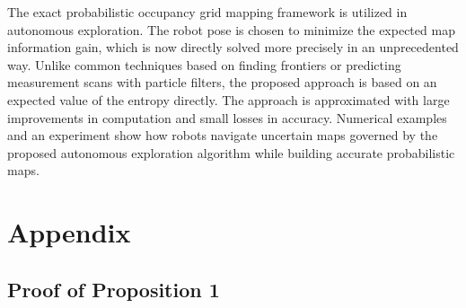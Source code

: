 \documentclass[smallextended]{svjour3}       %
\begin{document}
The exact probabilistic occupancy grid mapping framework is utilized in autonomous exploration. The robot pose is chosen to minimize the expected map information gain, which is now directly solved more precisely in an unprecedented way. Unlike common techniques based on finding frontiers or predicting measurement scans with particle filters, the proposed approach is based on an expected value of the entropy directly. The approach is approximated with large improvements in computation and small losses in accuracy. Numerical examples and an experiment show how robots navigate uncertain maps governed by the proposed autonomous exploration algorithm while building accurate probabilistic maps.














\section*{Appendix}\label{append}


\subsection*{Proof of Proposition 1}
\end{document}
